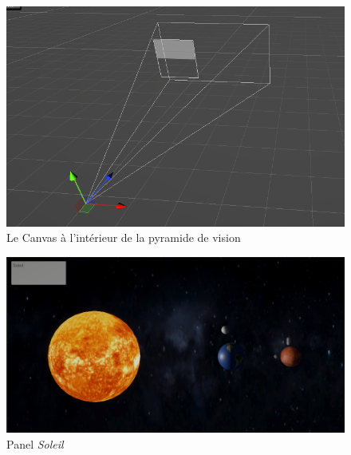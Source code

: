 \documentclass[a4paper,10pt]{article}
\begin{document}
\begin{figure}[h]
		\begin{center}
			\includegraphics[scale=.50]{fig/position-canvas}
			\caption{Le Canvas à l'intérieur de la pyramide de vision}
			\label{fig:positionCanvas}
		\end{center}
\end{figure}


\begin{figure}[h]
		\begin{center}
			\includegraphics[width=.7\textwidth]{fig/panel-soleil}
			\caption{Panel \textit{Soleil}}
			\label{fig:panel-soleil}
		\end{center}
\end{figure}
\end{document}

